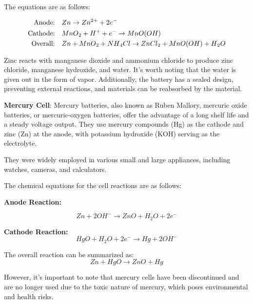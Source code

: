 \documentclass{article}
\begin{document}
\begin{flushleft}
The equations are as follows:

\begin{align*}
    \text{Anode:} & \quad Zn \rightarrow Zn^{2+} + 2e^- \\
    \text{Cathode:} & \quad MnO\textsubscript{2} + H^+ + e^- \rightarrow MnO(OH) \\
    \text{Overall:} & \quad Zn + MnO\textsubscript{2} + NH\textsubscript{4}Cl \rightarrow ZnCl\textsubscript{2} + MnO(OH) + H\textsubscript{2}O
\end{align*}

Zinc reacts with manganese dioxide and ammonium chloride to produce zinc chloride, manganese hydroxide, and water. It's worth noting that the water is given out in the form of vapor. Additionally, the battery has a sealed design, preventing external reactions, and materials can be reabsorbed by the material.
\linebreak
\vspace*{3pt}

\textbf{Mercury Cell}: Mercury batteries, also known as Ruben Mallory, mercuric oxide batteries, or mercuric-oxygen batteries, offer the advantage of a long shelf life and a steady voltage output. They use mercury compounds (Hg) as the cathode and zinc (Zn) at the anode, with potassium hydroxide (KOH) serving as the electrolyte.

They were widely employed in various small and large appliances, including watches, cameras, and calculators.

The chemical equations for the cell reactions are as follows:

\textbf{Anode Reaction:}

\begin{equation*}
    Zn + 2OH^- \rightarrow ZnO + H_2O + 2e^-
\end{equation*}

\textbf{Cathode Reaction:}
\begin{equation*}
    HgO + H_2O + 2e^- \rightarrow Hg + 2OH^-
\end{equation*}

The overall reaction can be summarized as:
\begin{equation*}
    Zn + HgO \rightarrow ZnO + Hg
\end{equation*}

However, it's important to note that mercury cells have been discontinued and are no longer used due to the toxic nature of mercury, which poses environmental and health risks.
\newline
\vspace*{3pt}


\end{flushleft}
\end{document}

